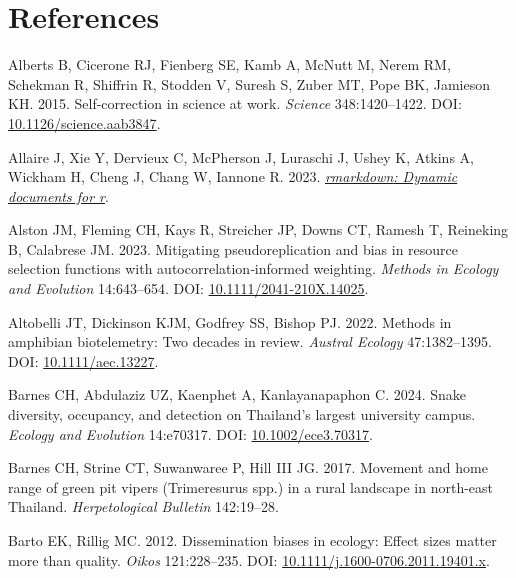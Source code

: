 \documentclass[10pt,a4paper]{article}
\newlength{\cslhangindent}
\newenvironment{CSLReferences}[2] %
 {\begin{list}{}{%
  \setlength{\itemindent}{0pt}
  \setlength{\leftmargin}{0pt}
  \setlength{\parsep}{0pt}
  \ifodd #1
   \setlength{\leftmargin}{\cslhangindent}
   \setlength{\itemindent}{-1\cslhangindent}
  \fi
  \setlength{\itemsep}{#2\baselineskip}}}
 {\end{list}}
\begin{document}
\section*{References}\label{references}

\label{refs}
\begin{CSLReferences}{1}{0}
Alberts B, Cicerone RJ, Fienberg SE, Kamb A, McNutt M, Nerem RM, Schekman R, Shiffrin R, Stodden V, Suresh S, Zuber MT, Pope BK, Jamieson KH. 2015. Self-correction in science at work. \emph{Science} 348:1420--1422. DOI: \href{https://doi.org/10.1126/science.aab3847}{10.1126/science.aab3847}.

Allaire J, Xie Y, Dervieux C, McPherson J, Luraschi J, Ushey K, Atkins A, Wickham H, Cheng J, Chang W, Iannone R. 2023. \emph{\href{https://github.com/rstudio/rmarkdown}{{rmarkdown}: Dynamic documents for r}}.

Alston JM, Fleming CH, Kays R, Streicher JP, Downs CT, Ramesh T, Reineking B, Calabrese JM. 2023. Mitigating pseudoreplication and bias in resource selection functions with autocorrelation‐informed weighting. \emph{Methods in Ecology and Evolution} 14:643--654. DOI: \href{https://doi.org/10.1111/2041-210X.14025}{10.1111/2041-210X.14025}.

Altobelli JT, Dickinson KJM, Godfrey SS, Bishop PJ. 2022. Methods in amphibian biotelemetry: {Two} decades in review. \emph{Austral Ecology} 47:1382--1395. DOI: \href{https://doi.org/10.1111/aec.13227}{10.1111/aec.13227}.

Barnes CH, Abdulaziz UZ, Kaenphet A, Kanlayanapaphon C. 2024. Snake diversity, occupancy, and detection on {Thailand}'s largest university campus. \emph{Ecology and Evolution} 14:e70317. DOI: \href{https://doi.org/10.1002/ece3.70317}{10.1002/ece3.70317}.

Barnes CH, Strine CT, Suwanwaree P, Hill III JG. 2017. Movement and home range of green pit vipers ({Trimeresurus} spp.) in a rural landscape in north-east {Thailand}. \emph{Herpetological Bulletin} 142:19--28.

Barto EK, Rillig MC. 2012. Dissemination biases in ecology: Effect sizes matter more than quality. \emph{Oikos} 121:228--235. DOI: \href{https://doi.org/10.1111/j.1600-0706.2011.19401.x}{10.1111/j.1600-0706.2011.19401.x}.


\end{CSLReferences}
\end{document}
